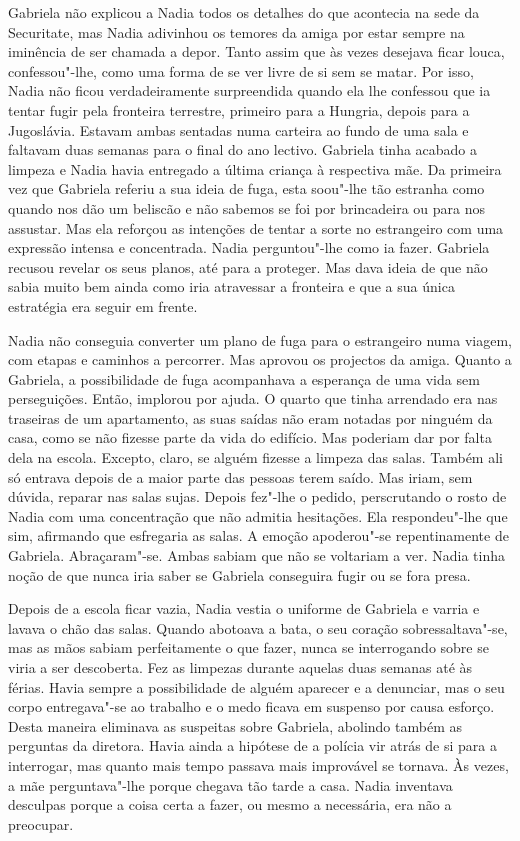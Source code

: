 Gabriela não explicou a Nadia todos os detalhes do que
acontecia na sede da Securitate, mas Nadia adivinhou os temores da amiga
por estar sempre na iminência de ser chamada a depor. Tanto assim que às
vezes desejava ficar louca, confessou"-lhe, como uma forma de se ver
livre de si sem se matar. Por isso, Nadia não ficou verdadeiramente
surpreendida quando ela lhe confessou que ia tentar fugir pela fronteira
terrestre, primeiro para a Hungria, depois para a Jugoslávia. Estavam
ambas sentadas numa carteira ao fundo de uma sala e faltavam duas
semanas para o final do ano lectivo. Gabriela tinha acabado a limpeza e
Nadia havia entregado a última criança à respectiva mãe. Da
primeira vez que Gabriela referiu a sua ideia de fuga, esta soou"-lhe tão
estranha como quando nos dão um beliscão e não sabemos se foi por
brincadeira ou para nos assustar. Mas ela reforçou as intenções de
tentar a sorte no estrangeiro com uma expressão intensa e concentrada.
Nadia perguntou"-lhe como ia fazer. Gabriela recusou revelar os seus
planos, até para a proteger. Mas dava ideia de que não sabia muito bem
ainda como iria atravessar a fronteira e que a sua única estratégia era
seguir em frente.

Nadia não conseguia converter um plano de fuga para o estrangeiro numa
viagem, com etapas e caminhos a percorrer. Mas aprovou os projectos da
amiga. Quanto a Gabriela, a possibilidade de fuga acompanhava a esperança de uma vida sem perseguições. Então, implorou por ajuda. O quarto
que tinha arrendado era nas traseiras de um apartamento, as suas saídas
não eram notadas por ninguém da casa, como se não fizesse parte da vida
do edifício. Mas poderiam dar por falta dela na escola. Excepto, claro,
se alguém fizesse a limpeza das salas. Também ali só entrava depois de
a maior parte das pessoas terem saído. Mas iriam, sem dúvida, reparar
nas salas sujas. Depois fez"-lhe o pedido, perscrutando o rosto de Nadia
com uma concentração que não admitia hesitações. Ela respondeu"-lhe que
sim, afirmando que esfregaria as salas. A emoção apoderou"-se
repentinamente de Gabriela. Abraçaram"-se. Ambas sabiam que não se
voltariam a ver. Nadia tinha noção de que nunca iria saber se Gabriela
conseguira fugir ou se fora presa.

Depois de a escola ficar vazia, Nadia vestia o uniforme
de Gabriela e varria e lavava o chão das salas. Quando
abotoava a bata, o seu coração sobressaltava"-se, mas as mãos sabiam
perfeitamente o que fazer, nunca se interrogando sobre se viria a ser
descoberta. Fez as limpezas durante aquelas duas semanas até às férias.
Havia sempre a possibilidade de alguém aparecer e a denunciar, mas o seu
corpo entregava"-se ao trabalho e o medo ficava em suspenso por causa
esforço. Desta maneira eliminava as suspeitas sobre Gabriela, abolindo
também as perguntas da diretora. Havia ainda a hipótese de a polícia
vir atrás de si para a interrogar, mas quanto mais tempo passava mais
improvável se tornava. Às vezes, a mãe perguntava"-lhe porque chegava tão tarde a casa. Nadia inventava desculpas porque a
coisa certa a fazer, ou mesmo a necessária, era não a preocupar.

